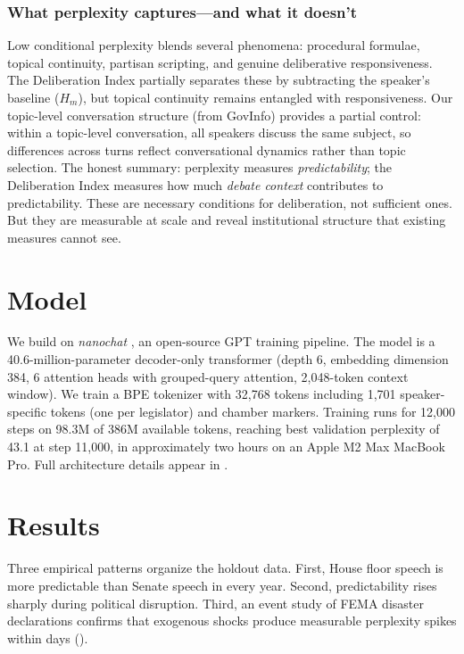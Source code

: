 \documentclass[12pt]{article}
\newcommand{\Hm}{H_m}
\begin{document}
\subsubsection*{What perplexity captures---and what it doesn't}
Low conditional perplexity blends several phenomena: procedural formulae, topical continuity, partisan scripting, and genuine deliberative responsiveness. The Deliberation Index partially separates these by subtracting the speaker's baseline ($\Hm$), but topical continuity remains entangled with responsiveness. Our topic-level conversation structure (from GovInfo) provides a partial control: within a topic-level conversation, all speakers discuss the same subject, so differences across turns reflect conversational dynamics rather than topic selection. The honest summary: perplexity measures \textit{predictability}; the Deliberation Index measures how much \textit{debate context} contributes to predictability. These are necessary conditions for deliberation, not sufficient ones. But they are measurable at scale and reveal institutional structure that existing measures cannot see.


\section{Model}

We build on \textit{nanochat} \citep{karpathy2025}, an open-source GPT training pipeline. The model is a 40.6-million-parameter decoder-only transformer (depth 6, embedding dimension 384, 6 attention heads with grouped-query attention, 2,048-token context window). We train a BPE tokenizer with 32,768 tokens including 1,701 speaker-specific tokens (one per legislator) and chamber markers. Training runs for 12,000 steps on 98.3M of 386M available tokens, reaching best validation perplexity of 43.1 at step 11,000, in approximately two hours on an Apple M2 Max MacBook Pro. Full architecture details appear in .


\section{Results}

Three empirical patterns organize the holdout data. First, House floor speech is more predictable than Senate speech in every year. Second, predictability rises sharply during political disruption. Third, an event study of FEMA disaster declarations confirms that exogenous shocks produce measurable perplexity spikes within days ().
\end{document}
